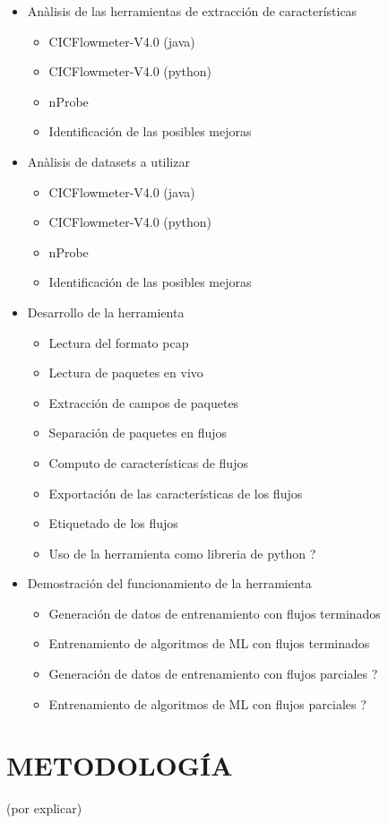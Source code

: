 \begin{itemize}
  \item Anàlisis de las herramientas de extracción de características
  \begin{itemize}
    \item CICFlowmeter-V4.0 (java)
    \item CICFlowmeter-V4.0 (python)
    \item nProbe
    \item Identificación de las posibles mejoras
  \end{itemize}
  \item Anàlisis de datasets a utilizar
  \begin{itemize}
    \item CICFlowmeter-V4.0 (java)
    \item CICFlowmeter-V4.0 (python)
    \item nProbe
    \item Identificación de las posibles mejoras
  \end{itemize}
  \item Desarrollo de la herramienta
  \begin{itemize}
    \item Lectura del formato pcap
    \item Lectura de paquetes en vivo
    \item Extracción de campos de paquetes
    \item Separación de paquetes en flujos
    \item Computo de características de flujos
    \item Exportación de las características de los flujos
    \item Etiquetado de los flujos
    \item Uso de la herramienta como libreria de python ?
  \end{itemize}
  \item Demostración del funcionamiento de la herramienta
  \begin{itemize}
    \item Generación de datos de entrenamiento con flujos terminados
    \item Entrenamiento de algoritmos de ML con flujos terminados
    \item Generación de datos de entrenamiento con flujos parciales ?
    \item Entrenamiento de algoritmos de ML con flujos parciales ?
  \end{itemize}
\end{itemize}

\section*{METODOLOGÍA}

(por explicar)
